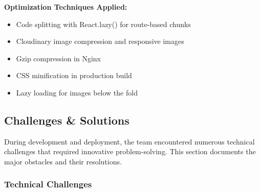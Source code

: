 \documentclass[12pt,a4paper]{article}
\begin{document}
\textbf{Optimization Techniques Applied:}
\begin{itemize}[noitemsep]
  \item Code splitting with React.lazy() for route-based chunks
  \item Cloudinary image compression and responsive images
  \item Gzip compression in Nginx
  \item CSS minification in production build
  \item Lazy loading for images below the fold
\end{itemize}

\subsection{Challenges \& Solutions}

During development and deployment, the team encountered numerous technical challenges that required innovative problem-solving. This section documents the major obstacles and their resolutions.

\subsubsection{Technical Challenges}
\end{document}
